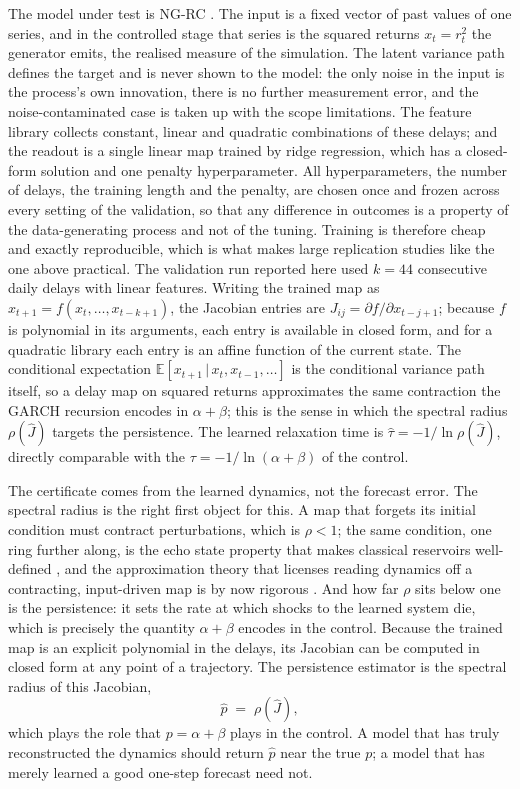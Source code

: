 \documentclass[12pt,a4paper]{article}
\begin{document}
The model under test is NG-RC \citep{gauthier2021}. The input is a fixed
vector of past values of one series, and in the controlled stage that
series is the squared returns $x_t = r_t^2$ the generator emits, the
realised measure of the simulation. The latent variance path defines
the target and is never shown to the model: the only noise in the input
is the process's own innovation, there is no further measurement error,
and the noise-contaminated case is taken up with the scope
limitations. The feature library collects
constant, linear and quadratic combinations of these delays; and the
readout is a single linear map trained by ridge regression, which has a
closed-form solution and one penalty hyperparameter. All hyperparameters,
the number of delays, the training length and the penalty, are chosen
once and frozen across every setting of the validation, so that any
difference in outcomes is a property of the data-generating process and
not of the tuning. Training is
therefore cheap and exactly reproducible, which is what makes large
replication studies like the one above practical. The validation run
reported here used $k = 44$ consecutive daily delays with linear
features. Writing the trained map as $\hat x_{t+1} = f(x_t,
\dots, x_{t-k+1})$, the Jacobian entries are $J_{ij} = \partial f
/ \partial x_{t-j+1}$; because $f$ is polynomial in its arguments,
each entry is available in closed form, and for a quadratic library each
entry is an affine function of the current state. The conditional
expectation $\mathbb{E}[x_{t+1} \,|\, x_t, x_{t-1}, \dots]$ is the
conditional variance path itself, so a delay map on squared returns
approximates the same contraction the GARCH recursion encodes in
$\alpha+\beta$; this is the sense in which the spectral radius
$\rho(\hat J)$ targets the persistence. The learned relaxation time is
$\hat\tau = -1/\ln\rho(\hat J)$, directly comparable with the
$\tau = -1/\ln(\alpha+\beta)$ of the control.

The certificate comes from the learned dynamics, not the forecast error.
The spectral radius is the right first object for this. A map that
forgets its initial condition must contract perturbations, which is
$\rho < 1$; the same condition, one ring further along, is the echo
state property that makes classical reservoirs well-defined
\citep{jaegerhaas2004}, and the approximation theory that licenses
reading dynamics off a contracting, input-driven map is by now rigorous
\citep{harthookdawes2021,hart2024}. And how far $\rho$ sits below one is the
persistence: it sets the rate at which shocks to the learned system die,
which is precisely the quantity $\alpha+\beta$ encodes in the control.
Because the trained map is an explicit polynomial in the delays, its
Jacobian can be computed in closed form at any point of a trajectory.
The persistence estimator is the spectral radius of this Jacobian,
\begin{equation}
\hat{p} \;=\; \rho\!\left(\widehat{J}\right),
\end{equation}
which plays the role that $p = \alpha + \beta$ plays in the control. A
model that has truly reconstructed the dynamics should return $\hat{p}$
near the true $p$; a model that has merely learned a good one-step
forecast need not.
\end{document}

